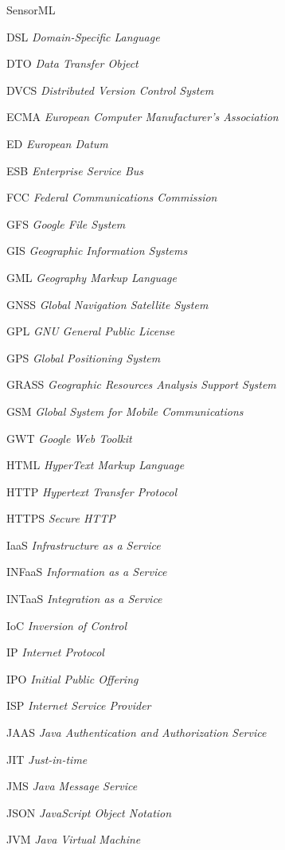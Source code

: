\documentclass[diss]{template/setrem}
\begin{document}
\begin{listofabbrv}{SensorML}
\item[DSL] \emph{Domain-Specific Language}
\item[DTO] \emph{Data Transfer Object}
\item[DVCS] \emph{Distributed Version Control System}
\item[ECMA] \emph{European Computer Manufacturer's Association}
\item[ED] \emph{European Datum}
\item[ESB] \emph{Enterprise Service Bus}
\item[FCC] \emph{Federal Communications Commission}
\item[GFS] \emph{Google File System}
\item[GIS] \emph{Geographic Information Systems}
\item[GML] \emph{Geography Markup Language}
\item[GNSS] \emph{Global Navigation Satellite System}
\item[GPL] \emph{GNU General Public License}
\item[GPS] \emph{Global Positioning System}
\item[GRASS] \emph{Geographic Resources Analysis Support System}
\item[GSM] \emph{Global System for Mobile Communications}
\item[GWT] \emph{Google Web Toolkit}
\item[HTML] \emph{HyperText Markup Language}
\item[HTTP] \emph{Hypertext Transfer Protocol}
\item[HTTPS] \emph{Secure HTTP}
\item[IaaS] \emph{Infrastructure as a Service}
\item[INFaaS] \emph{Information as a Service}
\item[INTaaS] \emph{Integration as a Service}
\item[IoC] \emph{Inversion of Control}
\item[IP] \emph{Internet Protocol}
\item[IPO] \emph{Initial Public Offering}
\item[ISP] \emph{Internet Service Provider}
\item[JAAS] \emph{Java Authentication and Authorization Service}
\item[JIT] \emph{Just-in-time}
\item[JMS] \emph{Java Message Service}
\item[JSON] \emph{JavaScript Object Notation}
\item[JVM] \emph{Java Virtual Machine}

\end{listofabbrv}
\end{document}
